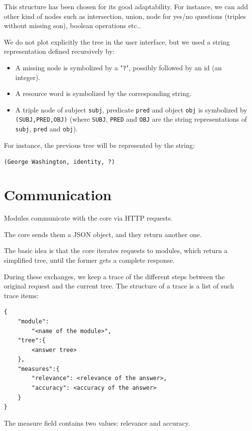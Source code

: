 This structure has been chosen for its good adaptability. For instance, we can add other kind of nodes such as intersection, union, node for yes/no questions (triples without missing son), boolean operations etc..

We do not plot explicitly the tree in the user interface, but we used a string representation defined recursively by:
\begin{itemize}
 \item A missing node is symbolized by a "\texttt{?}", possibly followed by an id (an integer).
 \item A resource word is symbolized by the corresponding string.
 \item A triple node of subject \texttt{subj}, predicate \texttt{pred} and object \texttt{obj} is symbolized by \texttt{(SUBJ,PRED,OBJ)} (where \texttt{SUBJ},  \texttt{PRED} and \texttt{OBJ} are the string representations of \texttt{subj}, \texttt{pred} and \texttt{obj}).
\end{itemize}

For instance, the previous tree will be represented by the string:

\begin{center}
    \texttt{(George Washington, identity, ?)}
\end{center}

\section{Communication}

Modules communicate with the core via HTTP requests.

The core sends them a JSON object, and they return another one.

The basic idea is that the core iterates requests to modules, which return a simplified tree, until the former gets a complete response.

During these exchanges, we keep a trace of the different steps between the original request and the current tree. The structure of a trace is a list of such trace items:
\begin{verbatim}
{
    "module":
        "<name of the module>", 
    "tree":{
        <answer tree>
    },
    "measures":{
        "relevance": <relevance of the answer>,
        "accuracy": <accuracy of the answer>
    }
}
\end{verbatim}

The measure field contains two values: relevance and accuracy.

